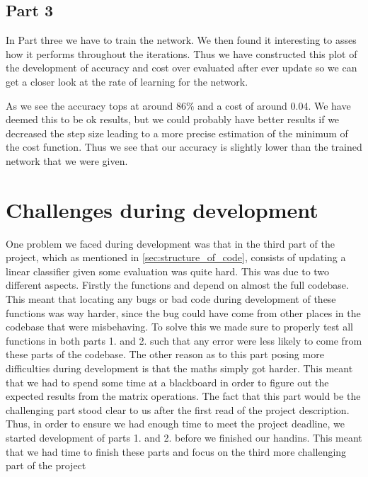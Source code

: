 \documentclass[a4paper,oneside,article,english]{memoir}
\begin{document}
\subsection{Part 3}
In Part three we have to train the network. We then found it interesting to asses how it performs throughout the iterations. Thus we have constructed this plot of the development of accuracy and cost over evaluated after ever update so we can get a closer look at the rate of learning for the network.



As we see the accuracy tops at around $86\%$ and a cost of around 0.04. We have deemed this to be ok results, but we could probably have better results if we decreased the step size leading to a more precise estimation of the minimum of the cost function. Thus we see that our accuracy is slightly lower than the trained network that we were given.


\section{Challenges during development}  
\label{sec:challenges_during_development}

One problem we faced during development was that in the third part of the
project, which as mentioned in \cref{sec:structure_of_code}, consists of
updating a linear classifier given some evaluation was quite hard. This was due
to two different aspects. Firstly the functions  and
 depend on almost the full codebase. This meant that
locating any bugs or bad code during development of these functions was way
harder, since the bug could have come from other places in the codebase that
were misbehaving. To solve this we made sure to properly test all functions in
both parts 1. and 2. such that any error were less likely to come from these
parts of the codebase. The other reason as to this part posing more
difficulties during development is that the maths simply got harder. This meant
that we had to spend some time at a blackboard in order to figure out the
expected results from the matrix operations. The fact that this part would be
the challenging part stood clear to us after the first read of the project
description. Thus, in order to ensure we had enough time to meet the project
deadline, we started development of parts 1. and 2. before we finished our
handins. This meant that we had time to finish these parts and focus on the
third more challenging part of the project 
\end{document}
